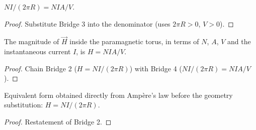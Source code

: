\begin{lemma}
\label{lem:IPhO2026Problems_problem_IPhO_2026_3_A_1:meanRadius_form_eq_volume_form}
$N I / (2\pi R) = N I A / V$.
\end{lemma}
\begin{proof}
Substitute Bridge 3 into the denominator
(uses $2\pi R > 0$, $V > 0$).
\end{proof}

\begin{theorem}[A.1 main target: $H = NIA/V$]
\label{thm:IPhO2026Problems_problem_IPhO_2026_3_A_1:paramagneticTorus_H_eq}
The magnitude of $\vec{H}$ inside the paramagnetic torus, in terms of
$N$, $A$, $V$ and the instantaneous current $I$, is
$H = N I A / V$.
\end{theorem}
\begin{proof}
Chain Bridge 2 ($H = NI/(2\pi R)$) with Bridge 4
($NI/(2\pi R) = NIA/V$).
\end{proof}

\begin{theorem}
\label{thm:IPhO2026Problems_problem_IPhO_2026_3_A_1:paramagneticTorus_H_eq_meanRadius}
Equivalent form obtained directly from Ampère's law before the geometry
substitution: $H = N I / (2\pi R)$.
\end{theorem}
\begin{proof}
Restatement of Bridge 2.
\end{proof}

